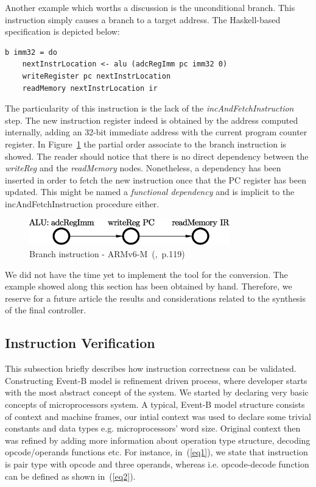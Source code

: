 \documentclass[conference]{IEEEtran}
\begin{document}
Another example which worths a discussion is the unconditional branch. This
instruction simply causes a branch to a target address. The Haskell-based specification is
depicted below:\\

\begin{lstlisting}[caption=B instruction - Farfalle specification,
frame=single, label=lis:and]
b imm32 = do
    nextInstrLocation <- alu (adcRegImm pc imm32 0)
    writeRegister pc nextInstrLocation
    readMemory nextInstrLocation ir
\end{lstlisting}

\noindent
The particularity of this instruction is the lack of the \textit{incAndFetchInstruction} step.
The new instruction register indeed is obtained by the address computed internally, adding an
32-bit immediate address with the current program counter register. In Figure~\ref{fig:bPO}
the partial order associate to the branch instruction is showed. The reader should notice that
there is no direct dependency between the \textit{writeReg} and the \textit{readMemory}
nodes. Nonetheless, a dependency has been inserted in order to fetch the new instruction once
that the PC register has been updated. This might be named a \textit{functional dependency}
and is implicit to the incAndFetchInstruction procedure either.

\begin{figure}[ht!]
\begin{center}
	\includegraphics[width=8.7cm]{IMG/b.eps}
	\caption{Branch instruction - ARMv6-M~(\cite{armManual},~p.119)}
	\label{fig:bPO}
\end{center}
\end{figure}

We did not have the time yet to implement the tool for the conversion.
The example showed along this section has been obtained by hand. Therefore, we reserve for a
future article the results and considerations related to the synthesis of the final
controller.

\subsection{Instruction Verification}

This subsection briefly describes how instruction correctness can be validated. Constructing Event-B model
is refinement driven process, where developer starts with the most abstract concept of the system. We
started by declaring very basic concepts of microprocessors system. A typical, Event-B model structure
consists of context and machine frames, our intial context was used to declare some trivial constants and
data types e.g.  microprocessors' word size. Original context then was refined by adding more information
about operation type structure, decoding opcode/operands functions etc. For instance, in~(\ref{eq1}),
we state that instruction is pair type with opcode and three operands, whereas i.e. opcode-decode function
can be defined as shown in~(\ref{eq2}).
\end{document}
